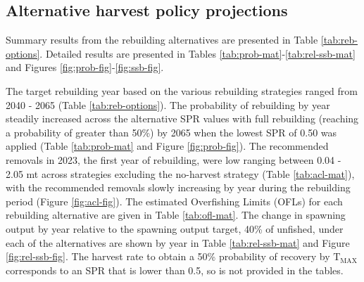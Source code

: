 \documentclass[11pt,
  english,
  a4paper,
]{article}
\begin{document}
\leavevmode\tagmcend\tagstructend\par


\hypertarget{alternative-harvest-policy-projections}{%
\subsection{Alternative harvest policy projections}\label{alternative-harvest-policy-projections}}

\leavevmode\tagmcend\tagstructend


Summary results from the rebuilding alternatives are presented in Table \ref{tab:reb-options}. Detailed results are presented in Tables \ref{tab:prob-mat}-\ref{tab:rel-ssb-mat} and Figures \ref{fig:prob-fig}-\ref{fig:ssb-fig}.

\leavevmode\tagmcend\tagstructend\par


The target rebuilding year based on the various rebuilding strategies ranged from 2040 - 2065 (Table \ref{tab:reb-options}). The probability of rebuilding by year steadily increased across the alternative SPR values with full rebuilding (reaching a probability of greater than 50\%) by 2065 when the lowest SPR of 0.50 was applied (Table \ref{tab:prob-mat} and Figure \ref{fig:prob-fig}). The recommended removals in 2023, the first year of rebuilding, were low ranging between 0.04 - 2.05 mt across strategies excluding the no-harvest strategy (Table \ref{tab:acl-mat}), with the recommended removals slowly increasing by year during the rebuilding period (Figure \ref{fig:acl-fig}). The estimated Overfishing Limits (OFLs) for each rebuilding alternative are given in Table \ref{tab:ofl-mat}. The change in spawning output by year relative to the spawning output target, 40\% of unfished, under each of the alternatives are shown by year in Table \ref{tab:rel-ssb-mat} and Figure \ref{fig:rel-ssb-fig}. The harvest rate to obtain a 50\% probability of recovery by {\(\text{T}_\text{MAX}\)\leavevmode\tagmcend\tagstructend} corresponds to an SPR that is lower than 0.5, so is not provided in the tables.

\leavevmode\tagmcend\tagstructend\par
\end{document}
